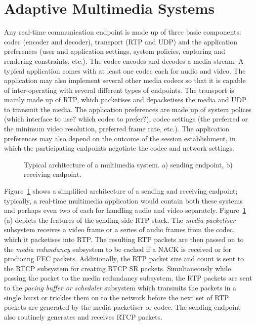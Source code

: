 \section{Adaptive Multimedia Systems}
\label{fw.amusys}

Any real-time communication endpoint is made up of three basic components:
codec (encoder and decoder), transport (RTP and UDP) and the application
preferences (user and application settings, system policies, capturing and
rendering constraints, etc.). The codec encodes and decodes a media stream. A
typical application comes with at least one codec each for audio and video. 
The application may also implement several other media codecs so that 
it is capable of inter-operating
with several different types of endpoints. The transport is mainly made up of
RTP, which packetises and depacketises the media and UDP to transmit the
media. The application preferences are made up of system polices (which
interface to use? which codec to prefer?), codec settings (the
preferred or the minimum video resolution, preferred frame rate, etc.). The
application preferences may also depend on the outcome of the session
establishment, in which the participating endpoints negotiate the codec and
network settings.

\begin{figure}
  \centerline{
  }
  \centerline{
  }
  
  \caption{Typical architecture of a multimedia system. a) sending endpoint,
  b) receiving endpoint.}
  \label{fig:4:appint}
\end{figure}

Figure~\ref{fig:4:appint} shows a simplified architecture of a sending and
receiving endpoint; typically, a real-time multimedia application would
contain both these systems and perhaps even two of each for handling audio and
video separately. Figure~\ref{fig:4:appint} (a) depicts the features of the
sending-side RTP stack. The \emph{media packetiser} subsystem receives a video
frame or a series of audio frames from the codec, which it packetises into
RTP. The resulting RTP packets are then passed on to the \emph{media
redundancy} subsystem to be cached if a NACK is received or for producing FEC
packets. Additionally, the RTP packet size and count is sent to the RTCP
subsystem for creating RTCP SR packets. Simultaneously while passing the
packet to the media redundancy subsystem, the RTP packets are sent to the
\emph{pacing buffer or scheduler} subsystem which transmits the packets in a
single burst or trickles them on to the network before the next set of RTP
packets are generated by the media packetiser or codec. The sending endpoint
also routinely generates and receives RTCP packets.

